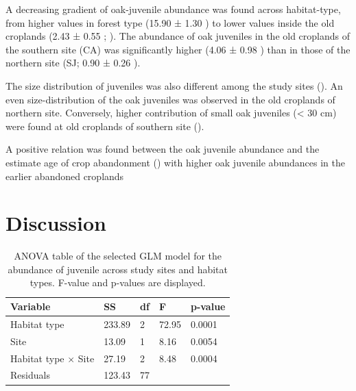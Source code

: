 A decreasing gradient of oak-juvenile abundance was found across habitat-type, from higher values in forest type (15.90 ± 1.30 \juv) to lower values inside the old croplands (2.43 ± 0.55 \juv; ). The abundance of oak juveniles in the old croplands of the southern site (CA) was significantly higher (4.06 ± 0.98 \juv) than in those of the northern site (SJ; 0.90 ± 0.26 \juv). 

The size distribution of juveniles was also different among the study sites (). An even size-distribution of the oak juveniles was observed in the old croplands of northern site. Conversely, higher contribution of small oak juveniles (< 30 cm) were found at old croplands of southern site (). 

A positive relation was found between the oak juvenile abundance and the estimate age of crop abandonment () with higher oak juvenile abundances in the earlier abandoned croplands 

\section{Discussion}\label{sec:coloniza:disussion}

\begin{table}
\footnotesize
\caption{ANOVA table of the selected GLM model for the abundance of \Qpy juvenile across study sites and habitat types. F-value and p-values are displayed.}
\centering
\begin{tabular}{lllll} 
\toprule
\textbf{Variable}        & \textbf{SS} & \textbf{df} & \textbf{F} & \textbf{p-value}  \\ 
\midrule
Habitat type             & 233.89      & 2           & 72.95      &  0.0001           \\
Site                     & 13.09       & 1           & 8.16       & 0.0054            \\
Habitat type $\times$ Site & 27.19       & 2           & 8.48       & 0.0004            \\
Residuals                & 123.43      & 77          &            &                   \\
\bottomrule
\end{tabular}
\label{tab:coloniza:anova}
\end{table}


